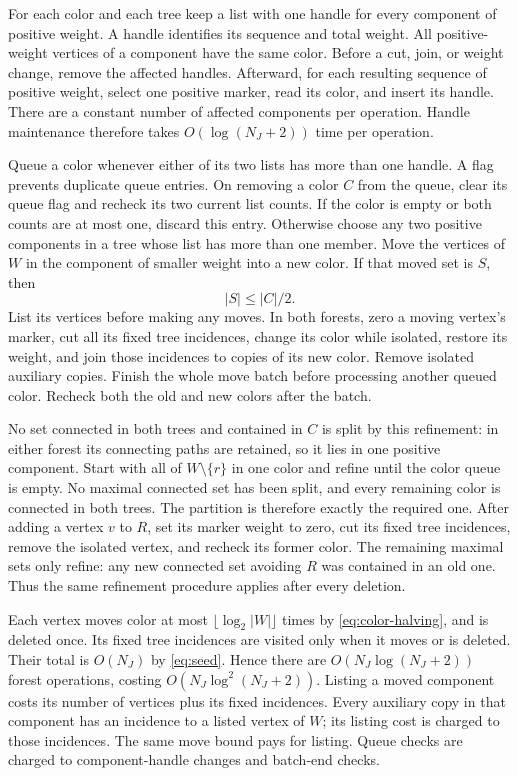 \documentclass[11pt]{article}
\theoremstyle{definition}
\theoremstyle{remark}
\begin{document}
For each color and each tree keep a list with one handle for every component of positive weight. A handle identifies its sequence and total weight. All positive-weight vertices of a component have the same color. Before a cut, join, or weight change, remove the affected handles. Afterward, for each resulting sequence of positive weight, select one positive marker, read its color, and insert its handle. There are a constant number of affected components per operation. Handle maintenance therefore takes \(O(\log(N_J+2))\) time per operation.

Queue a color whenever either of its two lists has more than one handle. A flag prevents duplicate queue entries. On removing a color \(C\) from the queue, clear its queue flag and recheck its two current list counts. If the color is empty or both counts are at most one, discard this entry. Otherwise choose any two positive components in a tree whose list has more than one member. Move the vertices of \(W\) in the component of smaller weight into a new color. If that moved set is \(S\), then
\begin{equation}
 |S|\le |C|/2.
 \label{eq:color-halving}
\end{equation}
List its vertices before making any moves. In both forests, zero a moving vertex's marker, cut all its fixed tree incidences, change its color while isolated, restore its weight, and join those incidences to copies of its new color. Remove isolated auxiliary copies. Finish the whole move batch before processing another queued color. Recheck both the old and new colors after the batch.

No set connected in both trees and contained in \(C\) is split by this refinement: in either forest its connecting paths are retained, so it lies in one positive component. Start with all of \(W\setminus\{r\}\) in one color and refine until the color queue is empty. No maximal connected set has been split, and every remaining color is connected in both trees. The partition is therefore exactly the required one. After adding a vertex \(v\) to \(R\), set its marker weight to zero, cut its fixed tree incidences, remove the isolated vertex, and recheck its former color. The remaining maximal sets only refine: any new connected set avoiding \(R\) was contained in an old one. Thus the same refinement procedure applies after every deletion.

Each vertex moves color at most \(\lfloor\log_2|W|\rfloor\) times by \eqref{eq:color-halving}, and is deleted once. Its fixed tree incidences are visited only when it moves or is deleted. Their total is \(O(N_J)\) by \eqref{eq:seed}. Hence there are \(O(N_J\log(N_J+2))\) forest operations, costing \(O(N_J\log^2(N_J+2))\). Listing a moved component costs its number of vertices plus its fixed incidences. Every auxiliary copy in that component has an incidence to a listed vertex of \(W\); its listing cost is charged to those incidences. The same move bound pays for listing. Queue checks are charged to component-handle changes and batch-end checks.
\end{document}

